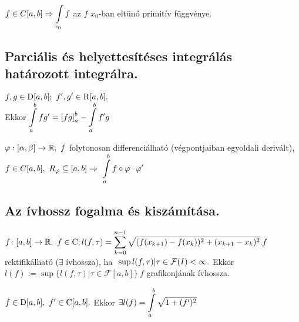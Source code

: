 \begin{kov}
  $f\in C[a,b]\nn\di\Int_{x_0}f$ az $f$ $x_0$-ban eltünő primitív függvénye.
\end{kov}

\subsection{Parciális és helyettesítéses integrálás határozott integrálra.}
\begin{te}
  $\displaystyle f,g\in \operatorname{D}[a,b];~f',g'\in \operatorname{R}[a,b].$\\
  Ekkor $\di\Int_a^b{fg'}=\left[fg\right]_a^b-\Int_a^b{f'g}$
\end{te}
\begin{te}
  $\varphi:[\alpha,\beta]\to\mathbb{R},~f$ folytonosan differenciálható (végpontjaiban egyoldali derivált), $f\in
  C[a,b],~R_\varphi\subseteq[a,b]\nn~\di\Int_a^b{f\circ\varphi\cdot\varphi'}$  
\end{te}


\subsection{Az ívhossz fogalma és kiszámítása.}
\begin{de}
  $f\colon [a,b]\to\mathbb{R},~f\in \operatorname{C};\\
   l(f,\tau)=\displaystyle\sum_{k=0}^{n-1}{\sqrt{(f(x_{k+1})-f(x_k))^2+(x_{k+1}-x_k)^2}}.\\
 f$ rektifikálható ($\exists$ ívhossza), ha $~\sup{l(f,\tau)|\tau\in \mathcal{F}(I)}<\infty.\\$
 Ekkor $l(f):=\sup{\{l(f,\tau)|\tau\in \mathcal{F}[a,b]\}}\ f$ grafikonjának ívhossza.
\end{de}
\begin{te}
  $f\in \operatorname{D}[a,b],~f'\in \operatorname{C}[a,b].\\$
   Ekkor $\exists l(f)=\di\Int_a^b{\sqrt{1+(f')^2}}$
\end{te}

